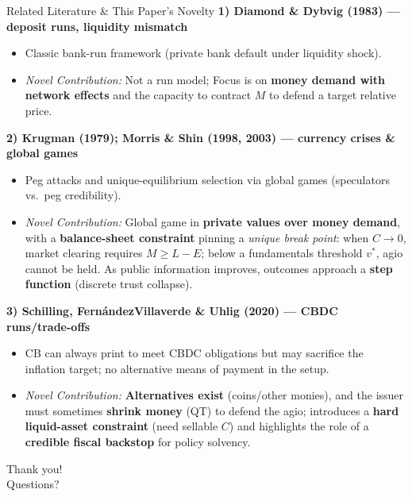 \documentclass[aspectratio=169, xcolor=table]{beamer}
\begin{document}
\begin{frame}{Related Literature \& This Paper’s Novelty}
  \footnotesize
  \textbf{1) Diamond \& Dybvig (1983) — deposit runs, liquidity mismatch}
  \begin{itemize}
    \item Classic bank-run framework (private bank default under liquidity shock).
    \item \textit{Novel Contribution:} Not a run model; Focus is on \textbf{money demand with network effects} and the capacity to contract $M$ to defend a target relative price.
  \end{itemize}

  \textbf{2) Krugman (1979); Morris \& Shin (1998, 2003) — currency crises \& global games}
  \begin{itemize}
    \item Peg attacks and unique-equilibrium selection via global games (speculators vs.\ peg credibility).
    \item \textit{Novel Contribution:} Global game in \textbf{private values over money demand}, with a \textbf{balance-sheet constraint} pinning a \emph{unique break point}: when $C\!\to\!0$, market clearing requires $M \ge L-E$; below a fundamentals threshold $v^*$, agio cannot be held. As public information improves, outcomes approach a \textbf{step function} (discrete trust collapse).
  \end{itemize}

  \textbf{3) Schilling, Fernández\textendash Villaverde \& Uhlig (2020) — CBDC runs/trade-offs}
  \begin{itemize}
    \item CB can always print to meet CBDC obligations but may sacrifice the inflation target; no alternative means of payment in the setup.
    \item \textit{Novel Contribution:} \textbf{Alternatives exist} (coins/other monies), and the issuer must sometimes \textbf{shrink money} (QT) to defend the agio; introduces a \textbf{hard liquid-asset constraint} (need sellable $C$) and highlights the role of a \textbf{credible fiscal backstop} for policy solvency.
  \end{itemize}

\end{frame}

\begin{frame}
  \centering
  \Large
  Thank you!\\
  Questions?
\end{frame}
\end{document}
